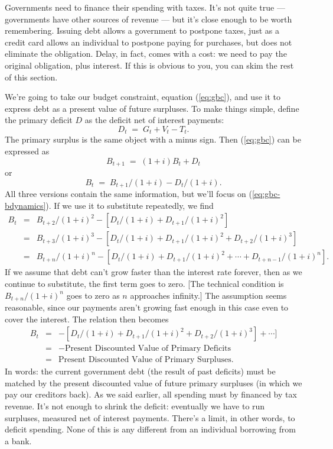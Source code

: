 \documentclass[letterpaper,12pt]{article}
\begin{document}
Governments need to finance their spending with taxes.
It's not quite true --- governments have other sources of revenue ---
but it's close enough to be worth remembering.  
Issuing debt allows a government to postpone taxes, 
just as a credit card allows an individual to postpone paying 
for purchases, 
but does not eliminate the obligation.  
Delay, in fact, comes with a cost:  we need to pay the original 
obligation, plus interest.  
If this is obvious to you,  you can skim the rest of this section.


We're going to take our budget constraint, equation (\ref{eq:gbc}), 
and use it to express debt as a present value of future surpluses.  
To make things simple, define the primary deficit $D$ as the deficit 
net of interest payments:
\[
    D_t \;=\;  G_t + V_t - T_t .
\]
The primary surplus is the same object with a minus sign. 
Then (\ref{eq:gbc}) can be expressed as 
\[
    B_{t+1}   \;=\; (1+i) B_t + D_t 
\]
or 
\begin{equation}
    B_{t}   \;=\;  B_{t+1}/(1+i) - D_t/(1+i) .
    \label{eq:gbc-bdynamics}
\end{equation}
All three versions contain the same information, but we'll 
focus on (\ref{eq:gbc-bdynamics}).  
If we use it to substitute repeatedly, we find 
\begin{eqnarray*}
    B_{t}   &=&  B_{t+2}/(1+i)^2 - [D_t/(1+i)+ D_{t+1}/(1+i)^2] \\
            &=&  B_{t+3}/(1+i)^3 - 
                [D_t/(1+i)+ D_{t+1}/(1+i)^2 + D_{t+2}/(1+i)^3] \\
            &=&  B_{t+n}/(1+i)^n - 
                [D_t/(1+i)+ D_{t+1}/(1+i)^2 + \cdots + D_{t+n-1}/(1+i)^n] .
\end{eqnarray*}
If we assume that debt can't grow faster than the interest rate forever, 
then as we continue to substitute, the first term goes to zero.
[The technical condition is $B_{t+n}/(1+i)^n$ goes to zero as $n$ 
approaches infinity.]
The assumption seems reasonable, since our payments 
aren't growing fast enough in this case even to cover the interest.  
The relation then becomes  
\begin{eqnarray*}
    B_{t}   &=&  -[D_t/(1+i)+ D_{t+1}/(1+i)^2 + 
                   D_{t+2}/(1+i)^3] +   \cdots ]  \\
            &=& - \mbox{Present Discounted Value of Primary Deficits} \\
            &=& \mbox{Present Discounted Value of Primary Surpluses} .
\end{eqnarray*}
In words:   the current government debt (the result of past deficits) 
must be matched  by the present discounted value of future primary surpluses
(in which we pay our creditors back).  
As we said earlier, all spending must by financed by tax revenue.  
It's not enough to shrink the deficit:  eventually we have 
to run surpluses, measured net of interest payments.  
There's a limit, in other words, to deficit spending. 
None of this is any different from an individual borrowing 
from a bank.   
\end{document}
